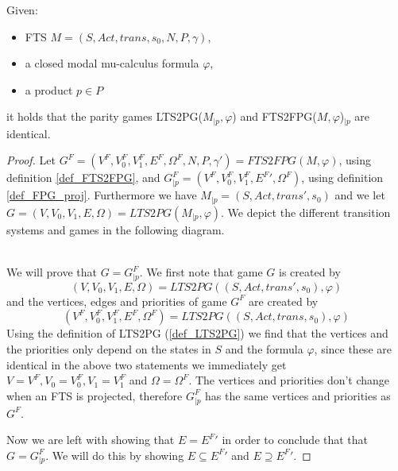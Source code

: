 \begin{theorem}
	\label{the_PGsubPGA} Given:
	\begin{itemize}
		\item FTS $M = (S,Act, trans, s_0, N, P, \gamma)$,
		\item a closed modal mu-calculus formula $\varphi$,
		\item a product $p \in P$
	\end{itemize}
	it holds that the parity games LTS2PG($M_{|p}, \varphi$) and FTS2FPG($M, \varphi$)$_{|p}$  are identical.
	\begin{proof}
		Let $G^F = (V^F, V_0^F, V_1^F, E^F, \Omega^F, N, P, \gamma') = FTS2FPG(M, \varphi)$, using definition \ref{def_FTS2FPG}, and $G^F_{|p} = (V^F, V_0^F, V_1^F, {E^F}', \Omega^F)$, using definition \ref{def_FPG_proj}. Furthermore we have $M_{|p} = (S, Act, trans', s_0)$ and we let $G = (V, V_0, V_1, E, \Omega) =  LTS2PG(M_{|p}, \varphi)$. We depict the different transition systems and games in the following diagram.
		
		\\
		We will prove that $G = G_{|p}^F$. We first note that game $G$ is created by 
		\[  (V, V_0, V_1, E, \Omega) = LTS2PG((S, Act, trans', s_0),\varphi) \]
		and the vertices, edges and priorities of game $G^F$ are created by 
		\[ (V^F, V_0^F, V_1^F, E^F, \Omega^F) = LTS2PG((S,Act, trans, s_0), \varphi)\]
		Using the definition of LTS2PG (\ref{def_LTS2PG}) we find that the vertices and the priorities only depend on the states in $S$ and the formula $\varphi$, since these are identical in the above two statements we immediately get $V = V^F, V_0 = V_0^F, V_1 = V_1^F$ and $\Omega = \Omega^F$. The vertices and priorities don't change when an FTS is projected, therefore $G_{|p}^F$ has the same vertices and priorities as $G^F$.
		
		Now we are left with showing that $E = {E^F}'$ in order to conclude that that $G = G^F_{|p}$. We will do this by showing $E \subseteq {E^F}'$ and $E \supseteq {E^F}'$.
		

\end{proof}
\end{theorem}
